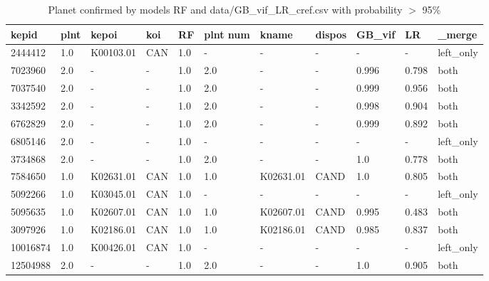 \begin{table}[!htbp]
 \centering
 \caption{Planet confirmed by models RF and data/GB\_vif\_LR\_cref.csv with probability $>$ 95\%}
 \label{dataRFGBvifLRcreftab} 
  \begin{tabular}
{| 
 p{}| 
 p{}| 
 p{}| 
 p{}| 
 p{}| 
 p{}| 
 p{}| 
 p{}| 
 p{}| 
 p{}| 
 p{}| 
}\hline 
\textbf{kepid} &\textbf{plnt} &\textbf{kepoi} &\textbf{koi} &\textbf{RF} &\textbf{plnt num} &\textbf{kname} &\textbf{dispos} &\textbf{GB\_vif} &\textbf{LR} &\textbf{\_merge} \\ \hline 
2444412 &1.0 &K00103.01 &CAN &1.0 &- &- &- &- &- &left\_only \\ \hline 
7023960 &2.0 &- &- &1.0 &2.0 &- &- &0.996 &0.798 &both \\ \hline 
7037540 &2.0 &- &- &1.0 &2.0 &- &- &0.999 &0.956 &both \\ \hline 
3342592 &2.0 &- &- &1.0 &2.0 &- &- &0.998 &0.904 &both \\ \hline 
6762829 &2.0 &- &- &1.0 &2.0 &- &- &0.999 &0.892 &both \\ \hline 
6805146 &2.0 &- &- &1.0 &- &- &- &- &- &left\_only \\ \hline 
3734868 &2.0 &- &- &1.0 &2.0 &- &- &1.0 &0.778 &both \\ \hline 
7584650 &1.0 &K02631.01 &CAN &1.0 &1.0 &K02631.01 &CAND &1.0 &0.805 &both \\ \hline 
5092266 &1.0 &K03045.01 &CAN &1.0 &- &- &- &- &- &left\_only \\ \hline 
5095635 &1.0 &K02607.01 &CAN &1.0 &1.0 &K02607.01 &CAND &0.995 &0.483 &both \\ \hline 
3097926 &1.0 &K02186.01 &CAN &1.0 &1.0 &K02186.01 &CAND &0.985 &0.837 &both \\ \hline 
10016874 &1.0 &K00426.01 &CAN &1.0 &- &- &- &- &- &left\_only \\ \hline 
12504988 &2.0 &- &- &1.0 &2.0 &- &- &1.0 &0.905 &both \\ \hline 

\end{tabular}
\end{table}
